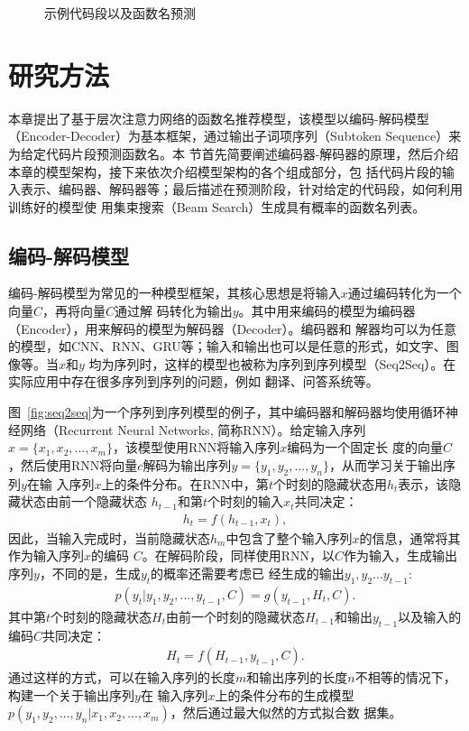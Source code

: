 \begin{figure}
\centering
{}
\hfill
{}
\caption{示例代码段以及函数名预测}
\label{stop}
\end{figure}

\section{研究方法}
本章提出了基于层次注意力网络的函数名推荐模型，该模型以编码-解码模型~\cite{Kyunghyun2014Learning}
（Encoder-Decoder）为基本框架，通过输出子词项序列（Subtoken Sequence）来为给定代码片段预测函数名。本
节首先简要阐述编码器-解码器的原理，然后介绍本章的模型架构，接下来依次介绍模型架构的各个组成部分，包
括代码片段的输入表示、编码器、解码器等；最后描述在预测阶段，针对给定的代码段，如何利用训练好的模型使
用集束搜索（Beam Search）生成具有概率的函数名列表。

\subsection{编码-解码模型}
编码-解码模型为常见的一种模型框架，其核心思想是将输入$x$通过编码转化为一个向量$C$，再将向量$C$通过解
码转化为输出$y$。其中用来编码的模型为编码器（Encoder），用来解码的模型为解码器（Decoder）。编码器和
解器均可以为任意的模型，如CNN、RNN、GRU等；输入和输出也可以是任意的形式，如文字、图像等。当$x$和$y$
均为序列时，这样的模型也被称为序列到序列模型（Seq2Seq）。在实际应用中存在很多序列到序列的问题，例如
翻译、问答系统等。

图~\ref{fig:seq2seq}为一个序列到序列模型的例子，其中编码器和解码器均使用循环神经网络（Recurrent Neural
Networks, 简称RNN）。给定输入序列$x=\{x_1,x_2,...,x_m\}$，该模型使用RNN将输入序列$x$编码为一个固定长
度的向量$C$，然后使用RNN将向量$c$解码为输出序列$y=\{y_1,y_2,...,y_n\}$，从而学习关于输出序列$y$在输
入序列$x$上的条件分布。在RNN中，第$t$个时刻的隐藏状态用$h_t$表示，该隐藏状态由前一个隐藏状态
$h_{t-1}$和第$t$个时刻的输入$x_t$共同决定：
\begin{eqnarray}
    h_t = f(h_{t-1},x_t),
\end{eqnarray}
因此，当输入完成时，当前隐藏状态$h_m$中包含了整个输入序列$x$的信息，通常将其作为输入序列$x$的编码
$C$。在解码阶段，同样使用RNN，以$C$作为输入，生成输出序列$y$，不同的是，生成$y_t$的概率还需要考虑已
经生成的输出$y_1,y_2...y_{t-1}$:
\begin{eqnarray}
    p(y_t|y_1,y_2,...,y_{t-1},C) = g(y_{t-1},H_t,C).
\end{eqnarray}
其中第$t$个时刻的隐藏状态$H_t$由前一个时刻的隐藏状态$H_{t-1}$和输出$y_{t-1}$以及输入的编码$C$共同决定：
\begin{eqnarray}
    H_t = f(H_{t-1},y_{t-1},C).
\end{eqnarray}
通过这样的方式，可以在输入序列的长度$m$和输出序列的长度$n$不相等的情况下，构建一个关于输出序列$y$在
输入序列$x$上的条件分布的生成模型$p(y_1,y_2,...,y_n|x_1,x_2,...,x_m)$，然后通过最大似然的方式拟合数
据集。

